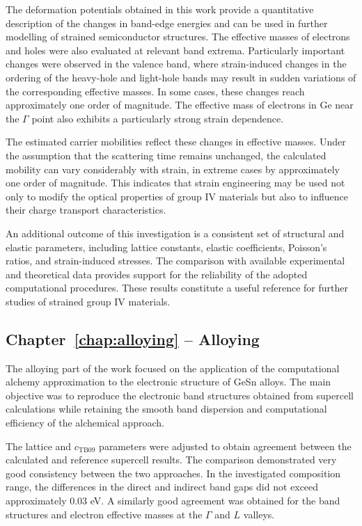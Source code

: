 The deformation potentials obtained in this work provide a quantitative description of the changes in band-edge energies and can be used in further modelling of strained semiconductor structures. The effective masses of electrons and holes were also evaluated at relevant band extrema. Particularly important changes were observed in the valence band, where strain-induced changes in the ordering of the heavy-hole and light-hole bands may result in sudden variations of the corresponding effective masses. In some cases, these changes reach approximately one order of magnitude. The effective mass of electrons in Ge near the $\Gamma$ point also exhibits a particularly strong strain dependence.

The estimated carrier mobilities reflect these changes in effective masses. Under the assumption that the scattering time remains unchanged, the calculated mobility can vary considerably with strain, in extreme cases by approximately one order of magnitude. This indicates that strain engineering may be used not only to modify the optical properties of group IV materials but also to influence their charge transport characteristics.

An additional outcome of this investigation is a consistent set of structural and elastic parameters, including lattice constants, elastic coefficients, Poisson's ratios, and strain-induced stresses. The comparison with available experimental and theoretical data provides support for the reliability of the adopted computational procedures. These results constitute a useful reference for further studies of strained group IV materials.

\ornament

\subsection*{Chapter~\ref{chap:alloying} -- Alloying}

The alloying part of the work focused on the application of the computational alchemy approximation to the electronic structure of GeSn alloys. The main objective was to reproduce the electronic band structures obtained from supercell calculations while retaining the smooth band dispersion and computational efficiency of the alchemical approach.

The lattice and $c_{\mathrm{TB09}}$ parameters were adjusted to obtain agreement between the calculated and reference supercell results. The comparison demonstrated very good consistency between the two approaches. In the investigated composition range, the differences in the direct and indirect band gaps did not exceed approximately $0.03$ eV. A similarly good agreement was obtained for the band structures and electron effective masses at the $\Gamma$ and $L$ valleys.

